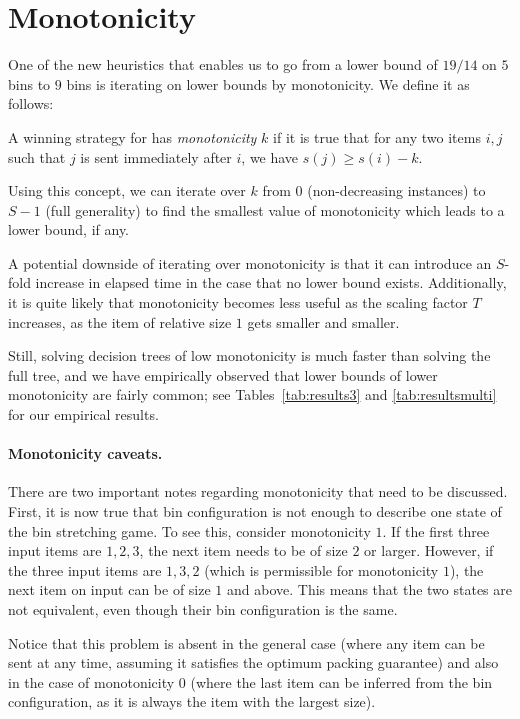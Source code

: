 \section{Monotonicity}\label{sec:monotonicity}

One of the new heuristics that enables us to go from a lower bound of
$19/14$ on $5$ bins to $9$ bins is iterating on lower bounds by
monotonicity. We define it as follows:

\begin{dfn}
A winning strategy for \adversary has \emph{monotonicity} $k$ if it is true
that for any two items $i,j$ such that $j$ is sent immediately after
$i$, we have $s(j) \ge s(i) - k$.
\end{dfn}

Using this concept, we can iterate over $k$ from $0$ (non-decreasing
instances) to $S-1$ (full generality) to find the smallest value of
monotonicity which leads to a lower bound, if any.

A potential downside of iterating over monotonicity is that it can
introduce an $S$-fold increase in elapsed time in the case that no
lower bound exists. Additionally, it is quite likely that monotonicity
becomes less useful as the scaling factor $T$ increases, as the item
of relative size $1$ gets smaller and smaller.

Still, solving decision trees of low monotonicity is much faster than
solving the full tree, and we have empirically observed that lower
bounds of lower monotonicity are fairly common; see
Tables~\ref{tab:results3} and \ref{tab:resultsmulti} for our empirical
results.

\paragraph{Monotonicity caveats.} There are two important notes
regarding monotonicity that need to be discussed. First, it is now
true that bin configuration is not enough to describe one state of the
bin stretching game. To see this, consider monotonicity $1$. If the
first three input items are $1,2,3$, the next item needs to be of size
$2$ or larger. However, if the three input items are $1,3,2$ (which is
permissible for monotonicity $1$), the next item on input can be of
size $1$ and above. This means that the two states are not equivalent,
even though their bin configuration is the same.

Notice that this problem is absent in the general case (where any item
can be sent at any time, assuming it satisfies the optimum packing
guarantee) and also in the case of monotonicity $0$ (where the last
item can be inferred from the bin configuration, as it is always the
item with the largest size).


